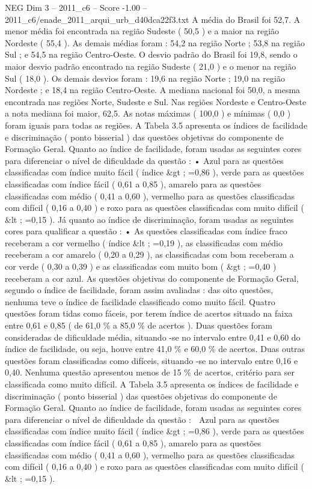 \begin{textsample}{NEG Dim 3 – 2011\_c6 – Score -1.00 – 2011\_c6/enade\_2011\_arqui\_urb\_d40dca22f3.txt}
A média do Brasil foi 52,7.
A menor média foi encontrada na região Sudeste ( 50,5 ) e a maior na região Nordeste ( 55,4 ).
As demais médias foram : 54,2 na região Norte ; 53,8 na região Sul ; e 54,5 na região Centro-Oeste.
O desvio padrão do Brasil foi 19,8, sendo o maior desvio padrão encontrado na região Sudeste ( 21,0 ) e o menor na região Sul ( 18,0 ).
Os demais desvios foram : 19,6 na região Norte ; 19,0 na região Nordeste ; e 18,4 na região Centro-Oeste.
A mediana nacional foi 50,0, a mesma encontrada nas regiões Norte, Sudeste e Sul.
Nas regiões Nordeste e Centro-Oeste a nota mediana foi maior, 62,5.
As notas máximas ( 100,0 ) e mínimas ( 0,0 ) foram iguais para todas as regiões.
A Tabela 3.5 apresenta os índices de facilidade e discriminação ( ponto bisserial ) das questões objetivas do componente de Formação Geral.
Quanto ao índice de facilidade, foram usadas as seguintes cores para diferenciar o nível de dificuldade da questão : • Azul para as questões classificadas com índice muito fácil ( índice \&gt ; =0,86 ), verde para as questões classificadas com índice fácil ( 0,61 a 0,85 ), amarelo para as questões classificadas com médio ( 0,41 a 0,60 ), vermelho para as questões classificadas com difícil ( 0,16 a 0,40 ) e roxo para as questões classificadas com muito difícil ( \&lt ; =0,15 ).
Já quanto ao índice de discriminação, foram usadas as seguintes cores para qualificar a questão : • As questões classificadas com índice fraco receberam a cor vermelho ( índice \&lt ; =0,19 ), as classificadas com médio receberam a cor amarelo ( 0,20 a 0,29 ), as classificadas com bom receberam a cor verde ( 0,30 a 0,39 ) e as classificadas com muito bom ( \&gt ; =0,40 ) receberam a cor azul.
As questões objetivas do componente de Formação Geral, segundo o índice de facilidade, foram assim avaliadas : das oito questões, nenhuma teve o índice de facilidade classificado como muito fácil.
Quatro questões foram tidas como fáceis, por terem índice de acertos situado na faixa entre 0,61 e 0,85 ( de 61,0 \% a 85,0 \% de acertos ).
Duas questões foram consideradas de dificuldade média, situando -se no intervalo entre 0,41 e 0,60 do índice de facilidade, ou seja, houve entre 41,0 \% e 60,0 \% de acertos.
Duas outras questões foram classificadas como difíceis, situando -se no intervalo entre 0,16 e 0,40.
Nenhuma questão apresentou menos de 15 \% de acertos, critério para ser classificada como muito difícil.
A Tabela 3.5 apresenta os índices de facilidade e discriminação ( ponto bisserial ) das questões objetivas do componente de Formação Geral.
Quanto ao índice de facilidade, foram usadas as seguintes cores para diferenciar o nível de dificuldade da questão :  Azul para as questões classificadas com índice muito fácil ( índice \&gt ; =0,86 ), verde para as questões classificadas com índice fácil ( 0,61 a 0,85 ), amarelo para as questões classificadas com médio ( 0,41 a 0,60 ), vermelho para as questões classificadas com difícil ( 0,16 a 0,40 ) e roxo para as questões classificadas com muito difícil ( \&lt ; =0,15 ).

\end{textsample}
